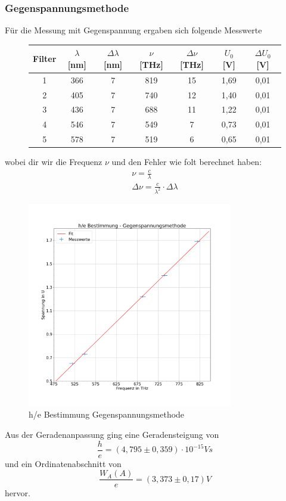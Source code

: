 \documentclass{scrartcl}
\begin{document}
		\subsubsection{Gegenspannungsmethode}
			Für die Messung mit Gegenspannung ergaben sich folgende Messwerte 
			\begin{figure}[H]
				\centering
				\begin{tabular}{|c|c|c|c|c|c|c|}
					\hline
					Filter & $\lambda$ [nm] & $\Delta\lambda$ [nm] & $\nu$ [THz] & $\Delta\nu$ [THz] & $U_0$ [V] & $\Delta U_0$ [V] \\
					
					\hline
					1 & 366 & 7 & 819 & 15 & 1,69 & 0,01\\
					2 & 405 & 7 & 740 & 12 & 1,40 & 0,01\\ 
					3 & 436 & 7 & 688 & 11 & 1,22 & 0,01\\
					4 & 546 & 7 & 549 & 7 & 0,73 & 0,01\\
					5 & 578 & 7 & 519 & 6 & 0,65 & 0,01\\
					\hline
				\end{tabular}
			\end{figure}
			wobei dir wir die Frequenz $\nu$ und den Fehler wie folt berechnet haben:
			\begin{align}
				\nu = \frac{c}{\lambda} \\
				\Delta \nu = \frac{c}{\lambda^2} \cdot \Delta \lambda
			\end{align}
			\begin{figure}[H]
				\centering
				\includegraphics[width=0.8\textwidth]{he_gegenspannung.png}
				\caption{h/e Bestimmung Gegenspannungsmethode}
			\end{figure}
			Aus der Geradenanpassung ging eine Geradensteigung von 
			\begin{equation}
				\frac{h}{e} = (4,795\pm 0,359)\cdot 10^{-15}V s
			\end{equation}
			und ein Ordinatenabschnitt von
			\begin{equation}
				\frac{W_A(A)}{e} = (3,373\pm 0,17)V
			\end{equation}
			hervor.
\end{document}
